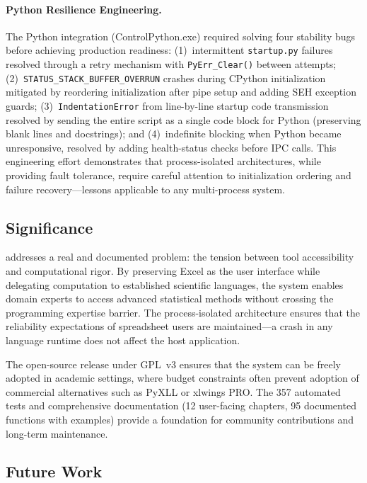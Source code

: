 \paragraph{Python Resilience Engineering.}
The Python integration (ControlPython.exe) required solving four stability bugs before achieving production readiness: (1)~intermittent \texttt{startup.py} failures resolved through a retry mechanism with \texttt{PyErr\_Clear()} between attempts; (2)~\texttt{STATUS\_STACK\_BUFFER\_OVERRUN} crashes during CPython initialization mitigated by reordering initialization after pipe setup and adding SEH exception guards; (3)~\texttt{IndentationError} from line-by-line startup code transmission resolved by sending the entire script as a single code block for Python (preserving blank lines and docstrings); and (4)~indefinite blocking when Python became unresponsive, resolved by adding health-status checks before IPC calls. This engineering effort demonstrates that process-isolated architectures, while providing fault tolerance, require careful attention to initialization ordering and failure recovery---lessons applicable to any multi-process system.

\subsection{Significance}

\neven{} addresses a real and documented problem: the tension between tool accessibility and computational rigor. By preserving Excel as the user interface while delegating computation to established scientific languages, the system enables domain experts to access advanced statistical methods without crossing the programming expertise barrier. The process-isolated architecture ensures that the reliability expectations of spreadsheet users are maintained---a crash in any language runtime does not affect the host application.

The open-source release under GPL~v3 ensures that the system can be freely adopted in academic settings, where budget constraints often prevent adoption of commercial alternatives such as PyXLL or xlwings PRO. The 357 automated tests and comprehensive documentation (12 user-facing chapters, 95 documented functions with examples) provide a foundation for community contributions and long-term maintenance.

\subsection{Future Work}

